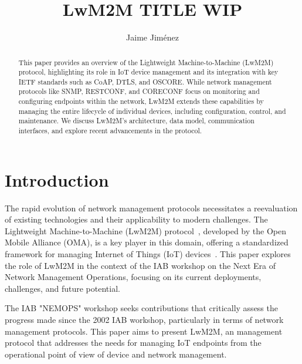 \documentclass[11pt,sigconf]{iabart}
\begin{document}
\title{LwM2M TITLE WIP}

\author{Jaime Jiménez}

\begin{abstract}

This paper provides an overview of the Lightweight Machine-to-Machine (LwM2M) protocol, highlighting its role in IoT device management and its integration with key IETF standards such as CoAP, DTLS, and OSCORE. While network management protocols like SNMP, RESTCONF, and CORECONF focus on monitoring and configuring endpoints within the network, LwM2M extends these capabilities by managing the entire lifecycle of individual devices, including configuration, control, and maintenance. We discuss LwM2M's architecture, data model, communication interfaces, and explore recent advancements in the protocol.

\end{abstract}


\maketitle

\section{Introduction} \label{introduction}



The rapid evolution of network management protocols necessitates a reevaluation of existing technologies and their applicability to modern challenges. The Lightweight Machine-to-Machine (LwM2M) protocol~\cite{lwm2m-spec}, developed by the Open Mobile Alliance (OMA), is a key player in this domain, offering a standardized framework for managing Internet of Things (IoT) devices~\cite{oma-sdo}. This paper explores the role of LwM2M in the context of the IAB workshop on the Next Era of Network Management Operations, focusing on its current deployments, challenges, and future potential.

The IAB "NEMOPS" workshop seeks contributions that critically assess the progress made since the 2002 IAB workshop, particularly in terms of network management protocols. This paper aims to present LwM2M, an management protocol that addresses the needs for managing IoT endpoints from the operational point of view of device and network management.
\end{document}
